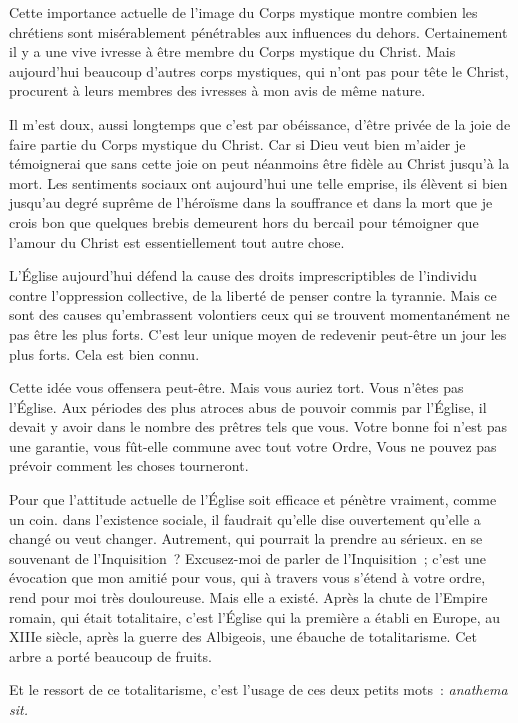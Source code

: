 \documentclass[french,twoside]{book} %
\begin{document}
Cette importance actuelle de l'image du Corps mystique montre combien les chrétiens sont misérablement pénétrables aux influences du dehors. Certainement il y a une vive ivresse à être membre du Corps mystique du Christ. Mais aujourd'hui beaucoup d'autres corps mystiques, qui n'ont pas pour tête le Christ, procurent à leurs membres des ivresses à mon avis de même nature.\par
Il m'est doux, aussi longtemps que c'est par obéissance, d'être privée de la joie de faire partie du Corps mystique du Christ. Car si Dieu veut bien m'aider je témoignerai que sans cette joie on peut néanmoins être fidèle au Christ jusqu'à la mort. Les sentiments sociaux ont aujourd'hui une telle emprise, ils élèvent si bien jusqu'au degré suprême de l'héroïsme dans la souffrance et dans la mort que je crois bon que quelques brebis demeurent hors du bercail pour témoigner que l'amour du Christ est essentiellement tout autre chose.\par
L'Église aujourd'hui défend la cause des droits imprescriptibles de l'individu contre l'oppression collective, de la liberté de penser contre la tyrannie. Mais ce sont des causes qu'embrassent volontiers ceux qui se trouvent momentanément ne pas être les plus forts. C'est leur unique moyen de redevenir peut-être un jour les plus forts. Cela est bien connu.\par
Cette idée vous offensera peut-être. Mais vous auriez tort. Vous n'êtes pas l'Église. Aux périodes des plus atroces abus de pouvoir commis par l'Église, il devait y avoir dans le nombre des prêtres tels que vous. Votre bonne foi n'est pas une garantie, vous fût-elle commune avec tout votre Ordre, Vous ne pouvez pas prévoir comment les choses tourneront.\par
Pour que l'attitude actuelle de l'Église soit efficace et pénètre vraiment, comme un coin. dans l'existence sociale, il faudrait qu'elle dise ouvertement qu'elle a changé ou veut changer. Autrement, qui pourrait la prendre au sérieux. en se souvenant de l'Inquisition ? Excusez-moi de parler de l'Inquisition ; c'est une évocation que mon amitié pour vous, qui à travers vous s'étend à votre ordre, rend pour moi très douloureuse. Mais elle a existé. Après la chute de l'Empire romain, qui était totalitaire, c'est l'Église qui la première a établi en Europe, au XIIIe siècle, après la guerre des Albigeois, une ébauche de totalitarisme. Cet arbre a porté beaucoup de fruits.\par
Et le ressort de ce totalitarisme, c'est l'usage de ces deux petits mots : {\itshape anathema sit.}\par
\end{document}
